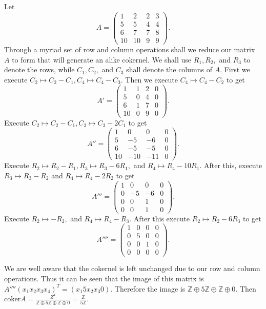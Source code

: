 \documentclass{article}
\begin{document}
\section{} %
Let $$A=\begin{pmatrix}
	1 & 2 & 2 &3 \\
	5 & 5 & 4 & 4\\
	6 & 7 & 7 & 8\\
	10 & 10 & 9 & 9
\end{pmatrix}.$$ Through a myriad set of row and column operations shall we reduce our matrix $A$ to form that will generate an alike cokernel. We shall use $R_1,R_2,$ and $R_3$ to denote the rows, while $C_1,C_2,$ and $C_3$ shall denote the columns of $A.$ First we execute $C_2 \mapsto C_2-C_1, C_4 \mapsto C_4 - C_3.$ Then we execute $C_4 \mapsto C_4 - C_2$ to get $$A'=\begin{pmatrix}
1 & 1 & 2 & 0\\
5 & 0 & 4 & 0\\
6 & 1 & 7 & 0\\
10 & 0 & 9 & 0
\end{pmatrix}.$$
Execute $C_2 \mapsto C_2 - C_1, C_3 \mapsto C_3- 2 C_1$ to get $$A''=\begin{pmatrix}
	1 & 0 & 0 & 0\\
	5 & -5 & -6 & 0\\
	6 & -5 & -5 & 0\\
	10 & -10 & -11 &0
\end{pmatrix}. $$
Execute $R_2 \mapsto R_2 -R_1, R_3 \mapsto R_3- 6R_1,$ and $R_4 \mapsto R_4 - 10R_1.$ After this, execute $R_3 \mapsto R_3-R_2$ and $R_4 \mapsto R_4 - 2R_2$ to get $$A'''=\begin{pmatrix}
	1 & 0 & 0 & 0\\
	0 & -5 & -6 & 0\\
	0 & 0 & 1 & 0\\
	0 & 0 & 1 & 0
\end{pmatrix}.$$ Execute $R_2 \mapsto -R_2,$ and $R_4 \mapsto R_4 - R_3.$ After this execute $R_2 \mapsto R_2 - 6R_3$ to get $$A''''=\begin{pmatrix}
	1 & 0 & 0 & 0\\
0 & 5 & 0 & 0\\
0 & 0 & 1 & 0\\
0 & 0 & 0 & 0
\end{pmatrix}.$$

We are well aware that the cokernel is left unchanged due to our row and column operations. Thus it can be seen that the image of this matrix is $A''''(x_1 x_2 x_3 x_4)^T=(x_1 5x_2 x_3 0).$ Therefore the image is $\mathbb{Z} \oplus 5\mathbb{Z} \oplus \mathbb{Z} \oplus 0.$ Then $\text{coker} A=\frac{Z^4}{\mathbb{Z} \oplus 5\mathbb{Z} \oplus \mathbb{Z} \oplus 0}= \frac{\mathbb{Z}}{5\mathbb{Z}}.$
\end{document}
